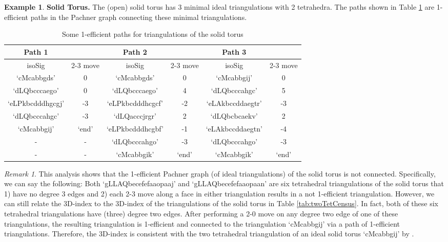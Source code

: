 \documentclass[12pt,reqno]{amsart}  %
\theoremstyle{definition}
\newtheorem{ex}[thm]{Example}
\theoremstyle{remark}
\newtheorem{rmk}[thm]{Remark}
\begin{document}
\begin{ex} 
{\bf Solid Torus.} 
The (open) solid torus has 3 minimal ideal triangulations with 2 tetrahedra. 
The paths shown in Table \ref{solid_torus_paths}
are 1-efficient paths in the Pachner graph
connecting these minimal triangulations. 

\begin{table}[ht]
\begin{tabular}{|c|c||c|c||c|c|}
\hline
Path 1 & & Path 2 & & Path 3& \\
\hline
isoSig & 2-3 move &isoSig & 2-3 move&isoSig & 2-3 move\\
\hline
`cMcabbgds' & 0 &`cMcabbgds'& 0&`cMcabbgij' & 0\\
 \hline
 `dLQbcccaego' & 0 & `dLQbcccaego' & 4 &`dLQbcccahgc'& 5\\
\hline
`eLPkbcdddhgcgj'& -3 & `eLPkbcdddhcgcf' & -2 &`eLAkbccddaegtr' & -3\\
\hline
`dLQbcccahgc' & -3 & `dLQacccjrgr' & 2 & `dLQbcbcaekv'& 2\\
\hline
`cMcabbgij' & `end' & `eLPkbcdddhcgbf'& -1 & `eLAkbccddaegtn' & -4\\
\hline
- & - & `dLQbcccahgo' & -3 & `dLQbcccahgo'& -3\\
\hline
- & - & `cMcabbgik' & `end' & `cMcabbgik' & `end'\\
\hline
\end{tabular}
\caption{\label{solid_torus_paths}Some 1-efficient paths for 
triangulations of the solid torus}
\end{table}
\end{ex}

\begin{rmk} 
This analysis shows that the 1-efficient Pachner graph (of ideal 
triangulations) of the solid torus is not connected. Specifically, we can 
say the following: Both `gLLAQbecefefaaopaaj' and `gLLAQbecefefaaopaan' are 
six tetrahedral triangulations of the solid torus that 
1) have no degree 3 edges and 2) each 2-3 move along a face in either 
triangulation results in a not 1-efficient triangulation. 
However, we can still relate the 3D-index to the 3D-index of the 
triangulations of the solid torus in Table \ref{tab:twoTetCensus}. 
In fact, both of these six tetrahedral triangulations have (three) degree 
two edges. After performing a 2-0 move on any degree two edge of one of 
these triangulations, the resulting triangulation is 1-efficient 
and connected to the triangulation  `cMcabbgij' via a path of 1-efficient 
triangulations. Therefore, the 3D-index is consistent with the two 
tetrahedral triangulation of an ideal solid torus `cMcabbgij' 
by \cite[Theorem 5.1]{GHRS}. 
\end{rmk} 
\end{document}
